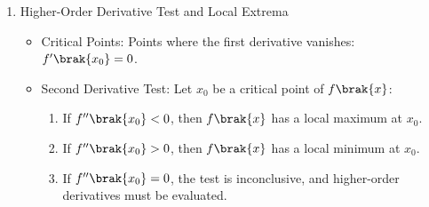 \begin{enumerate}[label=\thesubsection.\arabic*, ref=\thesubsection.\theenumi,itemsep=0pt]
\begin{itemize}
\begin{align}
G\brak{s} = \mathcal{L}\cbrak{g\brak{t}} = \int_{0}^{\infty} g\brak{t} e^{-st} \, dt \label{eq:laplace_def}
\end{align}
\item Derivative Properties:
\begin{align}
y'\brak{t} &\system{L} sY\brak{s} - y\brak{0} \label{eq:laplace_first_deriv} \\
y''\brak{t} &\system{L} s^2 Y\brak{s} - s y\brak{0} - y'\brak{0} \label{eq:laplace_second_deriv}
\end{align}
\item Standard Transform Pairs:
\begin{align}
u\brak{t} &\system{L} \frac{1}{s}, \quad \text{Re}\brak{s} > 0 \\
e^{at} u\brak{t} &\system{L} \frac{1}{s - a}, \quad \text{Re}\brak{s} > a \label{eq:laplace_exp_inv}
\end{align}
\end{itemize}

\item Higher-Order Derivative Test and Local Extrema
\begin{itemize}
\item Critical Points: Points where the first derivative vanishes: $f'\brak{x_0} = 0$.
\item Second Derivative Test: Let $x_0$ be a critical point of $f\brak{x}$:
\begin{enumerate}
    \item If $f''\brak{x_0} < 0$, then $f\brak{x}$ has a local maximum at $x_0$.
    \item If $f''\brak{x_0} > 0$, then $f\brak{x}$ has a local minimum at $x_0$.
    \item If $f''\brak{x_0} = 0$, the test is inconclusive, and higher-order derivatives must be evaluated.
\end{enumerate}
\end{itemize}


\end{enumerate}
